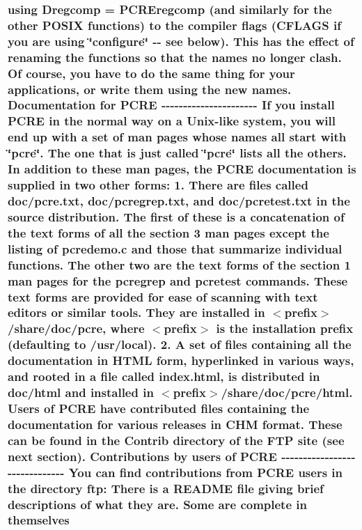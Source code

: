 \subsubsection[{\texorpdfstring{Dregcomp}{Dregcomp}}]{\setlength{\rightskip}{0pt plus 5cm}using {\bf Dregcomp} =  P\+C\+R\+Eregcomp (and similarly for the other P\+O\+S\+IX {\bf functions}) {\bf to} the {\bf compiler} {\bf flags} ({\bf C\+F\+L\+A\+GS} {\bf if} you {\bf are} using \char`\"{}configure\char`\"{} -\/-\/ see {\bf below}). This has the effect {\bf of} renaming the {\bf functions} {\bf so} that the {\bf names} no longer clash. Of {\bf course}, you have {\bf to} {\bf do} the same thing for your {\bf applications}, {\bf or} write {\bf them} using the new names. Documentation for {\bf P\+C\+RE} -\/-\/-\/-\/-\/-\/-\/-\/-\/-\/-\/-\/-\/-\/-\/-\/-\/-\/-\/-\/-\/-\/ If you {\bf install} {\bf P\+C\+RE} {\bf in} the normal {\bf way} {\bf on} {\bf a} Unix-\/like {\bf system}, you will {\bf end} up {\bf with} {\bf a} {\bf set} {\bf of} {\bf man} {\bf pages} whose {\bf names} {\bf all} {\bf start} {\bf with} \char`\"{}pcre\char`\"{}. The one that {\bf is} just called \char`\"{}pcre\char`\"{} lists {\bf all} the others. In {\bf addition} {\bf to} these {\bf man} {\bf pages}, the {\bf P\+C\+RE} {\bf documentation} {\bf is} supplied {\bf in} two other forms\+: 1. There {\bf are} {\bf files} called {\bf doc}/{\bf pcre.\+txt}, {\bf doc}/{\bf pcregrep.\+txt}, and {\bf doc}/{\bf pcretest.\+txt} {\bf in} the {\bf source} distribution. The {\bf first} {\bf of} these {\bf is} {\bf a} concatenation {\bf of} the {\bf text} forms {\bf of} {\bf all} the {\bf section} 3 {\bf man} {\bf pages} {\bf except} the listing {\bf of} {\bf pcredemo.\+c} and those that summarize individual functions. The other two {\bf are} the {\bf text} forms {\bf of} the {\bf section} 1 {\bf man} {\bf pages} for the pcregrep and {\bf pcretest} commands. These {\bf text} forms {\bf are} provided for ease {\bf of} {\bf scanning} {\bf with} {\bf text} editors {\bf or} similar tools. They {\bf are} {\bf installed} {\bf in} $<${\bf prefix}$>$/share/{\bf doc}/{\bf pcre}, {\bf where} $<${\bf prefix}$>$ {\bf is} the installation {\bf prefix} (defaulting {\bf to} /usr/local). 2. {\bf A} {\bf set} {\bf of} {\bf files} containing {\bf all} the {\bf documentation} {\bf in} H\+T\+ML form, hyperlinked {\bf in} various ways, and rooted {\bf in} {\bf a} {\bf file} called index.\+html, {\bf is} {\bf distributed} {\bf in} {\bf doc}/html and {\bf installed} {\bf in} $<${\bf prefix}$>$/share/{\bf doc}/{\bf pcre}/html. Users {\bf of} {\bf P\+C\+RE} have contributed {\bf files} containing the {\bf documentation} for various releases {\bf in} C\+HM format. These {\bf can} {\bf be} {\bf found} {\bf in} the Contrib {\bf directory} {\bf of} the F\+TP {\bf site} (see next {\bf section}). Contributions by users {\bf of} {\bf P\+C\+RE} -\/-\/-\/-\/-\/-\/-\/-\/-\/-\/-\/-\/-\/-\/-\/-\/-\/-\/-\/-\/-\/-\/-\/-\/-\/-\/-\/-\/-\/-\/ You {\bf can} find contributions {\bf from} {\bf P\+C\+RE} users {\bf in} the {\bf directory} ftp\+: There {\bf is} {\bf a} R\+E\+A\+D\+ME {\bf file} giving brief descriptions {\bf of} {\bf what} they are. Some {\bf are} complete {\bf in} {\bf themselves}}\hypertarget{README_8txt_ae7677822fff7f2fa74781785b5dd78e7}{}\label{README_8txt_ae7677822fff7f2fa74781785b5dd78e7}
